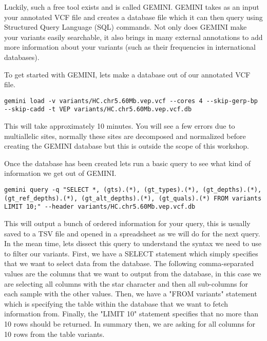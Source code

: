 Luckily, such a free tool exists and is called GEMINI. GEMINI takes as an input your annotated VCF file and creates a database file which it can then query using Structured Query Language (SQL) commands. Not only does GEMINI make your variants easily searchable, it also brings in many external annotations to add more information about your variants (such as their frequencies in international databases).

\begin{steps}
To get started with GEMINI, lets make a database out of our annotated VCF file.
\begin{lstlisting}
gemini load -v variants/HC.chr5.60Mb.vep.vcf --cores 4 --skip-gerp-bp --skip-cadd -t VEP variants/HC.chr5.60Mb.vep.vcf.db
\end{lstlisting}
\end{steps}

This will take approximately 10 minutes. You will see a few errors due to multiallelic sites, normally these sites are decomposed and normalized before creating the GEMINI database but this is outside the scope of this workshop.

Once the database has been created lets run a basic query to see what kind of information we get out of GEMINI.

\begin{steps}
\begin{lstlisting}
gemini query -q "SELECT *, (gts).(*), (gt_types).(*), (gt_depths).(*), (gt_ref_depths).(*), (gt_alt_depths).(*), (gt_quals).(*) FROM variants LIMIT 10;" --header variants/HC.chr5.60Mb.vep.vcf.db
\end{lstlisting}
\end{steps}

This will output a bunch of ordered information for your query, this is usually saved to a TSV file and opened in a spreadsheet as we will do for the next query. In the mean time, lets dissect this query to understand the syntax we need to use to filter our variants. First, we have a SELECT statement which simply specifies that we want to select data from the database. The following comma-separated values are the columns that we want to output from the database, in this case we are selecting all columns with the star character and then all sub-columns for each sample with the other values. Then, we have a "FROM variants" statement which is specifying the table within the database that we want to fetch information from. Finally, the "LIMIT 10" statement specifies that no more than 10 rows should be returned. In summary then, we are asking for all columns for 10 rows from the table variants.

